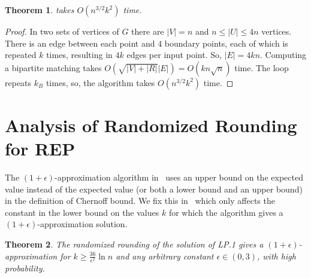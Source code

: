\documentclass[preprint,12pt]{elsarticle}
\newtheorem{theorem}{Theorem}
\newcommand{\size}[1]{\lvert #1 \rvert}
\begin{document}
\begin{theorem}
 takes $O(n^{3/2}k^2)$ time.
\end{theorem}
\begin{proof}
In two sets of vertices of $G$ there are $\size{V}=n$ and $n\leq \size{U}\leq 4n$ vertices. There is an edge between each point and $4$ boundary points, each of which is repeated $k$ times, resulting in $4k$ edges per input point. So, $\size{E}=4kn$.
Computing a bipartite matching takes $O(\sqrt{\size{V}+\size{R}}\size{E})=O(kn\sqrt{n})$ time. The loop repeats $k_B$ times, so, the algorithm takes $O(n^{3/2}k^2)$ time.
\end{proof}

\section{Analysis of Randomized Rounding for REP}
The $(1+\epsilon)$-approximation algorithm in~\cite{zar1} uses an upper bound on the expected value instead of the expected value (or both a lower bound and an upper bound) in the definition of Chernoff bound. We fix this in~ which only affects the constant in the lower bound on the values $k$ for which the algorithm gives a $(1+\epsilon)$-approximation solution.
\begin{theorem}\label{theorem:corrected}
The randomized rounding of the solution of LP.1 gives a $(1+\epsilon)$-approximation for $k\geq \frac{36}{\epsilon^2} \ln n$ and any arbitrary constant $\epsilon\in (0,3)$, with high probability.
\end{theorem}
\end{document}
